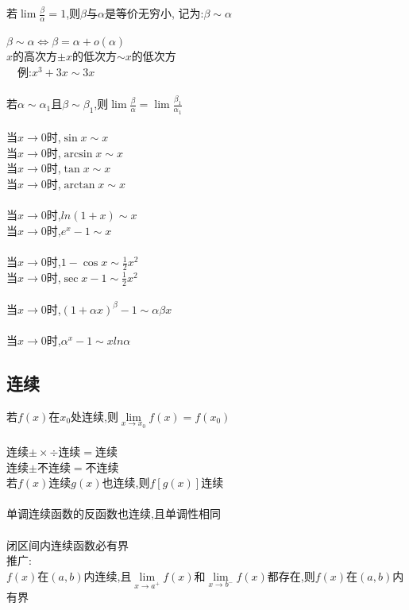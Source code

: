 \documentclass{article}
\begin{document}
\begin{flushleft}
	若$\lim \frac{\beta}{\alpha}=1$,则$\beta$与$\alpha$是等价无穷小,
	记为:$\beta \sim \alpha$\\
	~\\
	$\beta \sim \alpha \Leftrightarrow \beta = \alpha + o(\alpha)$\\
	$x$的高次方$\pm x$的低次方$\sim x$的低次方\\
	\ \ 例:$x^3+3x\sim 3x$\\
	~\\
	若$\alpha \sim \alpha_1$且$\beta \sim \beta_1$,则$\lim \frac{\beta}{\alpha} = \lim \frac{\beta_1}{\alpha_1}$\\
	~\\
	当$x\to 0$时,$\sin x \sim x$\\
	当$x\to 0$时,$\arcsin x \sim x$\\
	当$x\to 0$时,$\tan x \sim x$\\
	当$x\to 0$时,$\arctan x \sim x$\\
	~\\
	当$x\to 0$时,$ln(1+x) \sim x$\\
	当$x\to 0$时,$e^x-1 \sim x$\\
	~\\
	当$x\to 0$时,$1-\cos x \sim \frac{1}{2} x^2$\\
	当$x\to 0$时,$\sec x - 1 \sim \frac{1}{2} x^2$\\
	~\\
	当$x\to 0$时,$(1+\alpha x)^\beta -1 \sim \alpha\beta x$\\
	~\\
	当$x\to 0$时,$\alpha^x -1 \sim xln\alpha$\\
	
	\subsection{连续}
	
	若$f(x)$在$x_0$处连续,则$\lim\limits_{x\to x_0} f(x)=f(x_0)$\\
	~\\
	连续$\pm\times\div$连续$=$连续\\
	连续$\pm$不连续$=$不连续\\
	若$f(x)$连续$g(x)$也连续,则$f[g(x)]$连续\\
	~\\
	单调连续函数的反函数也连续,且单调性相同\\
	~\\
	闭区间内连续函数必有界\\
	推广:\\
	$f(x)$在$(a,b)$内连续,且$\lim\limits_{x\to a^+} f(x)$和$\lim\limits_{x\to b^-} f(x)$都存在,则$f(x)$在$(a,b)$内有界\\
	~\\

\end{flushleft}
\end{document}
